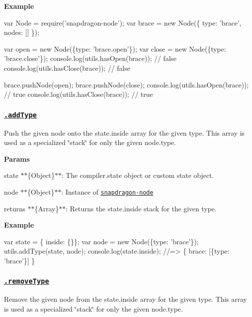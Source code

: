 {\bfseries Example}


\begin{DoxyCode}
var Node = require('snapdragon-node');
var brace = new Node(\{
  type: 'brace',
  nodes: []
\});

var open = new Node(\{type: 'brace.open'\});
var close = new Node(\{type: 'brace.close'\});
console.log(utils.hasOpen(brace)); // false
console.log(utils.hasClose(brace)); // false

brace.pushNode(open);
brace.pushNode(close);
console.log(utils.hasOpen(brace)); // true
console.log(utils.hasClose(brace)); // true
\end{DoxyCode}


\subsubsection*{\href{index.js#L719}{\tt .add\+Type}}

Push the given {\ttfamily node} onto the {\ttfamily state.\+inside} array for the given type. This array is used as a specialized \char`\"{}stack\char`\"{} for only the given {\ttfamily node.\+type}.

{\bfseries Params}


\begin{DoxyItemize}
\item {\ttfamily state} $\ast$$\ast$\{Object\}$\ast$$\ast$\+: The {\ttfamily compiler.\+state} object or custom state object.
\item {\ttfamily node} $\ast$$\ast$\{Object\}$\ast$$\ast$\+: Instance of \href{https://github.com/jonschlinkert/snapdragon-node}{\tt snapdragon-\/node}
\item {\ttfamily returns} $\ast$$\ast$\{Array\}$\ast$$\ast$\+: Returns the {\ttfamily state.\+inside} stack for the given type.
\end{DoxyItemize}

{\bfseries Example}


\begin{DoxyCode}
var state = \{ inside: \{\}\};
var node = new Node(\{type: 'brace'\});
utils.addType(state, node);
console.log(state.inside);
//=> \{ brace: [\{type: 'brace'\}] \}
\end{DoxyCode}


\subsubsection*{\href{index.js#L759}{\tt .remove\+Type}}

Remove the given {\ttfamily node} from the {\ttfamily state.\+inside} array for the given type. This array is used as a specialized \char`\"{}stack\char`\"{} for only the given {\ttfamily node.\+type}.

